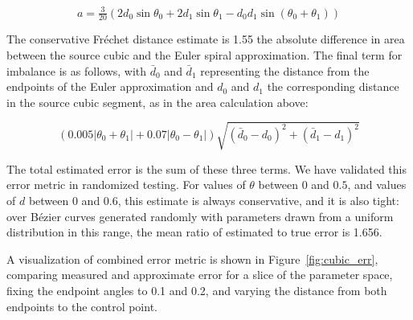 \documentclass[sigconf, nonacm]{acmart}
\begin{document}
\[
    a = \tfrac{3}{20}(2d_0\sin \theta_0 + 2d_1\sin \theta_1 - d_0 d_1\sin(\theta_0+\theta_1))
\]

The conservative Fréchet distance estimate is 1.55 the absolute difference in area between the source cubic and the Euler spiral approximation. The final term for imbalance is as follows, with $\bar{d}_0$ and $\bar{d}_1$ representing the distance from the endpoints of the Euler approximation and $d_0$ and $d_1$ the corresponding distance in the source cubic segment, as in the area calculation above:

\[
    (0.005|\theta_0+\theta_1| + 0.07|\theta_0 - \theta_1|)\sqrt{(\bar{d}_0 - d_0)^2 + (\bar{d}_1 - d_1)^2}
\]

The total estimated error is the sum of these three terms. We have validated this error metric in randomized testing. For values of $\theta$ between $0$ and $0.5$, and values of $d$ between $0$ and $0.6$, this estimate is always conservative, and it is also tight: over Bézier curves generated randomly with parameters drawn from a uniform distribution in this range, the mean ratio of estimated to true error is 1.656.

A visualization of combined error metric is shown in Figure~\ref{fig:cubic_err}, comparing measured and approximate error for a slice of the parameter space, fixing the endpoint angles to 0.1 and 0.2, and varying the distance from both endpoints to the control point.
\end{document}

